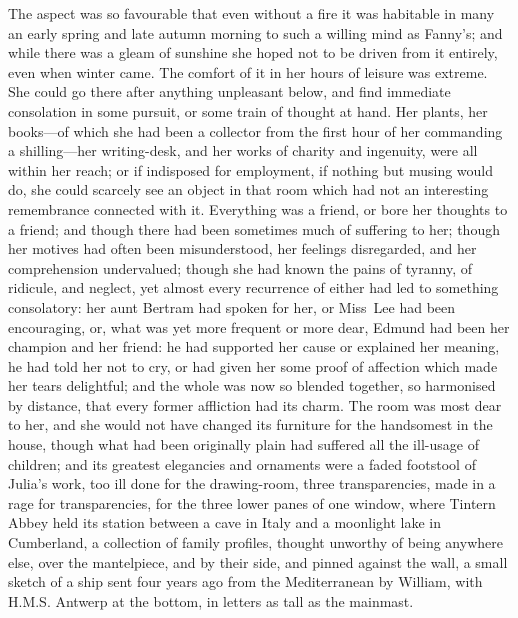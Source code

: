 The aspect was so favourable that even without a fire it was habitable in many an early spring and late autumn morning to such a willing mind as Fanny's; and while there was a gleam of sunshine she hoped not to be driven from it entirely, even when winter came. The comfort of it in her hours of leisure was extreme. She could go there after anything unpleasant below, and find immediate consolation in some pursuit, or some train of thought at hand. Her plants, her books—of which she had been a collector from the first hour of her commanding a shilling—her writing-desk, and her works of charity and ingenuity, were all within her reach; or if indisposed for employment, if nothing but musing would do, she could scarcely see an object in that room which had not an interesting remembrance connected with it. Everything was a friend, or bore her thoughts to a friend; and though there had been sometimes much of suffering to her; though her motives had often been misunderstood, her feelings disregarded, and her comprehension undervalued; though she had known the pains of tyranny, of ridicule, and neglect, yet almost every recurrence of either had led to something consolatory: her aunt Bertram had spoken for her, or Miss~Lee had been encouraging, or, what was yet more frequent or more dear, Edmund had been her champion and her friend: he had supported her cause or explained her meaning, he had told her not to cry, or had given her some proof of affection which made her tears delightful; and the whole was now so blended together, so harmonised by distance, that every former affliction had its charm. The room was most dear to her, and she would not have changed its furniture for the handsomest in the house, though what had been originally plain had suffered all the ill-usage of children; and its greatest elegancies and ornaments were a faded footstool of Julia's work, too ill done for the drawing-room, three transparencies, made in a rage for transparencies, for the three lower panes of one window, where Tintern Abbey held its station between a cave in Italy and a moonlight lake in Cumberland, a collection of family profiles, thought unworthy of being anywhere else, over the mantelpiece, and by their side, and pinned against the wall, a small sketch of a ship sent four years ago from the Mediterranean by William, with H.M.S. Antwerp at the bottom, in letters as tall as the mainmast.

